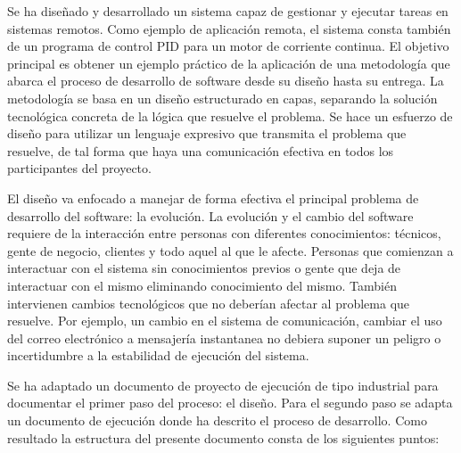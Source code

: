 
Se ha diseñado y desarrollado un sistema capaz de gestionar y ejecutar tareas en sistemas remotos.
Como ejemplo de aplicación remota, el sistema consta también de un programa de control PID para un motor de corriente continua.
El objetivo principal es obtener un ejemplo práctico de la aplicación de una metodología que abarca el proceso de desarrollo de software desde su diseño hasta su entrega.
La metodología se basa en un diseño estructurado en capas, separando la solución tecnológica concreta de la lógica que resuelve el problema.
Se hace un esfuerzo de diseño para utilizar un lenguaje expresivo que transmita el problema que resuelve, de tal forma que haya una comunicación efectiva en todos los participantes del proyecto.

El diseño va enfocado a manejar de forma efectiva el principal problema de desarrollo del software: la evolución.
La evolución y el cambio del software requiere de la interacción entre personas con diferentes conocimientos: técnicos, gente de negocio, clientes y todo aquel al que le afecte. Personas que comienzan a interactuar con el sistema sin conocimientos previos o gente que deja de interactuar con el mismo eliminando conocimiento del mismo.
También intervienen cambios tecnológicos que no deberían afectar al problema que resuelve. Por ejemplo, un cambio en el sistema de comunicación, cambiar el uso del correo electrónico a mensajería instantanea no debiera suponer un peligro o incertidumbre a la estabilidad de ejecución del sistema.

Se ha adaptado un documento de proyecto de ejecución de tipo industrial para documentar el primer paso del proceso: el diseño.
Para el segundo paso se adapta un documento de ejecución donde ha descrito el proceso de desarrollo.
Como resultado la estructura del presente documento consta de los siguientes puntos:

